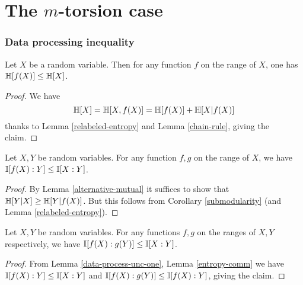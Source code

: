 \chapter{The $m$-torsion case}

\subsection{Data processing inequality}

\begin{lemma}\label{data-process-single}\leanok  Let $X$ be a random variable.  Then for any function $f$ on the range of $X$, one has $\mathbb{H}[f(X)] \leq \mathbb{H}[X]$.
\end{lemma}

\begin{proof}\leanok
We have
$$ \mathbb{H}[X] = \mathbb{H}[X,f(X)] = \mathbb{H}[f(X)] + \mathbb{H}[X|f(X)]$$
thanks to Lemma \ref{relabeled-entropy} and Lemma \ref{chain-rule}, giving the claim.
\end{proof}

\begin{lemma}\label{data-process-unc-one}\leanok Let $X,Y$ be random variables. For any function $f, g$ on the range of $X$, we have $\mathbb{I}[f(X) : Y] \leq \mathbb{I}[X:Y]$.
\end{lemma}

\begin{proof}
  By Lemma \ref{alternative-mutual} it suffices to show that $\mathbb{H}[Y|X] \geq \mathbb{H}[Y|f(X)]$. But this follows from Corollary \ref{submodularity} (and Lemma \ref{relabeled-entropy}).
\end{proof}

\begin{lemma}\label{data-process-unc}\leanok Let $X,Y$ be random variables. For any functions $f, g$ on the ranges of $X, Y$ respectively, we have $\mathbb{I}[f(X) : g(Y )] \leq \mathbb{I}[X : Y]$.
\end{lemma}

\begin{proof}
   From Lemma \ref{data-process-unc-one}, Lemma \ref{entropy-comm} we have $\mathbb{I}[f(X) : Y] \leq \mathbb{I}[X:Y]$ and $\mathbb{I}[f(X): g(Y)] \leq \mathbb{I}[f(X):Y]$, giving the claim.
\end{proof}

